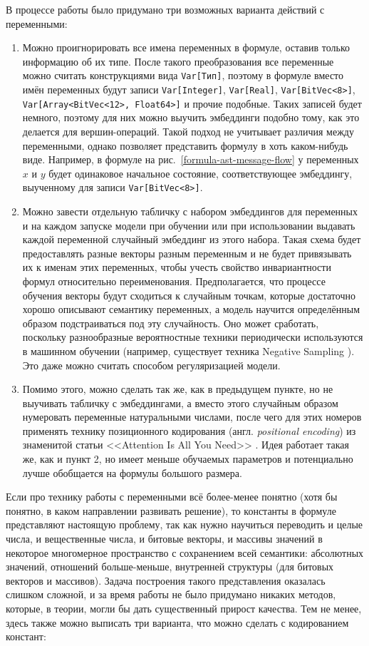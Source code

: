 В процессе работы было придумано три возможных варианта действий с переменными:

\begin{enumerate}
    \item Можно проигнорировать все имена переменных в формуле, оставив только информацию об их типе. После такого преобразования все переменные можно считать конструкциями вида \texttt{Var[Тип]}, поэтому в формуле вместо имён переменных будут записи \texttt{Var[Integer]}, \texttt{Var[Real]}, \texttt{Var[BitVec<8>]}, \texttt{Var[Array<BitVec<12>, Float64>]} и прочие подобные. Таких записей будет немного, поэтому для них можно выучить эмбеддинги подобно тому, как это делается для вершин-операций. Такой подход не учитывает различия между переменными, однако позволяет представить формулу в хоть каком-нибудь виде. Например, в формуле на рис.~\ref{formula-ast-message-flow} у переменных $x$ и $y$ будет одинаковое начальное состояние, соответствующее эмбеддингу, выученному для записи \texttt{Var[BitVec<8>]}.
    \item Можно завести отдельную табличку с набором эмбеддингов для переменных и на каждом запуске модели при обучении или при использовании выдавать каждой переменной случайный эмбеддинг из этого набора. Такая схема будет предоставлять разные векторы разным переменным и не будет привязывать их к именам этих переменных, чтобы учесть свойство инвариантности формул относительно переименования. Предполагается, что процессе обучения векторы будут сходиться к случайным точкам, которые достаточно хорошо описывают семантику переменных, а модель научится определённым образом подстраиваться под эту случайность. Оно может сработать, поскольку разнообразные вероятностные техники периодически используются в машинном обучении (например, существует техника Negative Sampling \cite{negative-sampling-paper}). Это даже можно считать способом регуляризацией модели.
    \item Помимо этого, можно сделать так же, как в предыдущем пункте, но не выучивать табличку с эмбеддингами, а вместо этого случайным образом нумеровать переменные натуральными числами, после чего для этих номеров применять технику позиционного кодирования (англ. \textit{positional encoding}) из знаменитой статьи <<Attention Is All You Need>> \cite{attention-is-all-you-need}. Идея работает такая же, как и пункт 2, но имеет меньше обучаемых параметров и потенциально лучше обобщается на формулы большого размера.
\end{enumerate}

Если про технику работы с переменными всё более-менее понятно (хотя бы понятно, в каком направлении развивать решение), то константы в формуле представляют настоящую проблему, так как нужно научиться переводить и целые числа, и вещественные числа, и битовые векторы, и массивы значений в некоторое многомерное пространство с сохранением всей семантики: абсолютных значений, отношений больше-меньше, внутренней структуры (для битовых векторов и массивов). Задача построения такого представления оказалась слишком сложной, и за время работы не было придумано никаких методов, которые, в теории, могли бы дать существенный прирост качества. Тем не менее, здесь также можно выписать три варианта, что можно сделать с кодированием констант:

